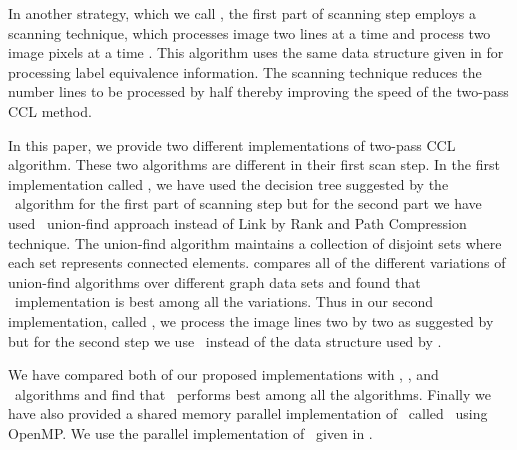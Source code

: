 In another strategy, which we call \arun, the first part of scanning step employs a scanning technique, which processes image two lines 
at a time and process two image pixels at a time \cite{He2012_ARun}. This
algorithm uses the same data structure given in \cite{He2008_Run} for processing label equivalence information. The scanning technique reduces the number lines to be
processed by half thereby improving the speed of the two-pass CCL method. %

In this paper, we provide two different implementations of two-pass CCL algorithm. These two algorithms are different in their
first scan step. In the first implementation called \nremsp, we have used the 
decision tree suggested by the \lrpc\ algorithm for the first part of scanning step but for the second part we have used
\rems\ union-find approach instead of Link by Rank and Path Compression technique. The union-find algorithm
maintains a collection of disjoint sets where each set represents connected elements.
\cite{Patwary2010_RemSP} compares all of the different variations of union-find algorithms over different graph data sets and found that
\rems\ implementation is best among all the variations. Thus in our second implementation, called \aremsp, we process the image lines
two by two as suggested by \cite{He2012_ARun} but for the second step
we use \remsp\ instead of the data structure used by \cite{He2012_ARun}.

We have compared both of our proposed implementations with \lrpc, \run, and
\arun\ algorithms and find that \aremsp\ performs best among all the algorithms.
Finally we have also provided a shared memory parallel implementation of
\aremsp\ called \paremsp\ using OpenMP.
We use the parallel implementation of \remsp\ given in \cite{Patwary2012_PARemSP}. 
